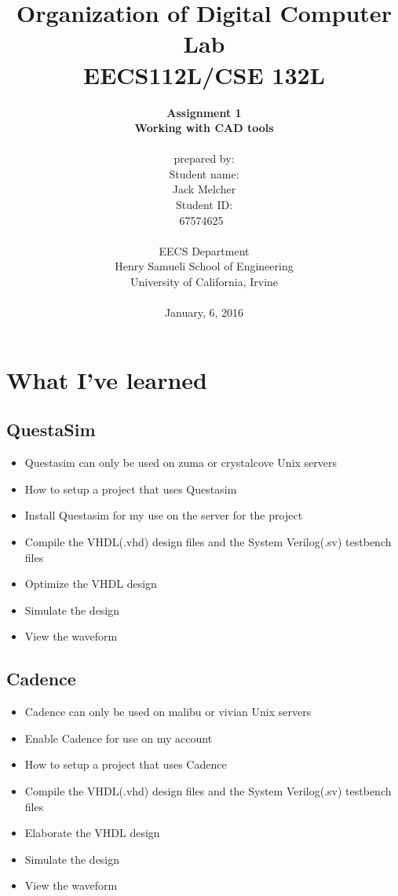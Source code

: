 \documentclass{article}
\begin{document}
\title{Organization of Digital Computer Lab \\ EECS112L/CSE 132L}
\author{\textbf{Assignment 1 }\\ \textbf{Working with CAD tools} \\ \\
prepared by: \\ Student name: \\Jack Melcher \\Student ID: \\67574625~\\ \\ 
EECS Department\\ Henry Samueli School of Engineering \\ University of California, Irvine \\ \\
{January, 6, 2016}} 


\date{}
\maketitle

\section{What I've learned}
	\subsection{QuestaSim}
		\begin{itemize}
			\item Questasim can only be used on zuma or crystalcove Unix servers
			\item How to setup a project that uses Questasim
			\item Install Questasim for my use on the server for the project
			\item Compile the VHDL(.vhd)  design files and the System Verilog(.sv) testbench files
			\item Optimize the VHDL design
			\item Simulate the design
			\item View the waveform
		\end{itemize}
	\subsection{Cadence}
		\begin{itemize}
			\item Cadence can only be used on malibu or vivian Unix servers
			\item Enable Cadence for use on my account
			\item How to setup a project that uses Cadence
			\item Compile the VHDL(.vhd)  design files and the System Verilog(.sv) testbench files
			\item Elaborate the VHDL design
			\item Simulate the design
			\item View the waveform
		\end{itemize}
		
\end{document}
